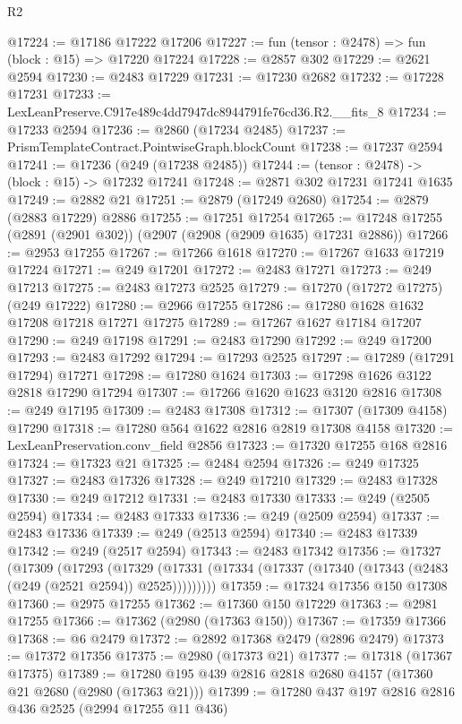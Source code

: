 \begin{lexlean}{R2}
\begin{coremodule}
@17224 := @17186 @17222 @17206
@17227 := fun (tensor : @2478) => fun (block : @15) => @17220 @17224
@17228 := @2857 @302
@17229 := @2621 @2594
@17230 := @2483 @17229
@17231 := @17230 @2682
@17232 := @17228 @17231
@17233 := LexLeanPreserve.C917e489c4dd7947dc8944791fe76cd36.R2.__fits_8
@17234 := @17233 @2594
@17236 := @2860 (@17234 @2485)
@17237 := PrismTemplateContract.PointwiseGraph.blockCount
@17238 := @17237 @2594
@17241 := @17236 (@249 (@17238 @2485))
@17244 := (tensor : @2478) -> (block : @15) -> @17232 @17241
@17248 := @2871 @302 @17231 @17241 @1635
@17249 := @2882 @21
@17251 := @2879 (@17249 @2680)
@17254 := @2879 (@2883 @17229) @2886
@17255 := @17251 @17254
@17265 := @17248 @17255 (@2891 (@2901 @302)) (@2907 (@2908 (@2909 @1635) @17231 @2886))
@17266 := @2953 @17255
@17267 := @17266 @1618
@17270 := @17267 @1633 @17219 @17224
@17271 := @249 @17201
@17272 := @2483 @17271
@17273 := @249 @17213
@17275 := @2483 @17273 @2525
@17279 := @17270 (@17272 @17275) (@249 @17222)
@17280 := @2966 @17255
@17286 := @17280 @1628 @1632 @17208 @17218 @17271 @17275
@17289 := @17267 @1627 @17184 @17207
@17290 := @249 @17198
@17291 := @2483 @17290
@17292 := @249 @17200
@17293 := @2483 @17292
@17294 := @17293 @2525
@17297 := @17289 (@17291 @17294) @17271
@17298 := @17280 @1624
@17303 := @17298 @1626 @3122 @2818 @17290 @17294
@17307 := @17266 @1620 @1623 @3120 @2816
@17308 := @249 @17195
@17309 := @2483 @17308
@17312 := @17307 (@17309 @4158) @17290
@17318 := @17280 @564 @1622 @2816 @2819 @17308 @4158
@17320 := LexLeanPreservation.conv_field @2856
@17323 := @17320 @17255 @168 @2816
@17324 := @17323 @21
@17325 := @2484 @2594
@17326 := @249 @17325
@17327 := @2483 @17326
@17328 := @249 @17210
@17329 := @2483 @17328
@17330 := @249 @17212
@17331 := @2483 @17330
@17333 := @249 (@2505 @2594)
@17334 := @2483 @17333
@17336 := @249 (@2509 @2594)
@17337 := @2483 @17336
@17339 := @249 (@2513 @2594)
@17340 := @2483 @17339
@17342 := @249 (@2517 @2594)
@17343 := @2483 @17342
@17356 := @17327
    (@17309
      (@17293
        (@17329 (@17331 (@17334 (@17337 (@17340 (@17343 (@2483 (@249 (@2521 @2594)) @2525)))))))))
@17359 := @17324 @17356 @150 @17308
@17360 := @2975 @17255
@17362 := @17360 @150 @17229
@17363 := @2981 @17255
@17366 := @17362 (@2980 (@17363 @150))
@17367 := @17359 @17366
@17368 := @6 @2479
@17372 := @2892 @17368 @2479 (@2896 @2479)
@17373 := @17372 @17356
@17375 := @2980 (@17373 @21)
@17377 := @17318 (@17367 @17375)
@17389 := @17280 @195 @439 @2816 @2818 @2680 @4157 (@17360 @21 @2680 (@2980 (@17363 @21)))
@17399 := @17280 @437 @197 @2816 @2816 @436 @2525 (@2994 @17255 @11 @436)

\end{coremodule}
\end{lexlean}
